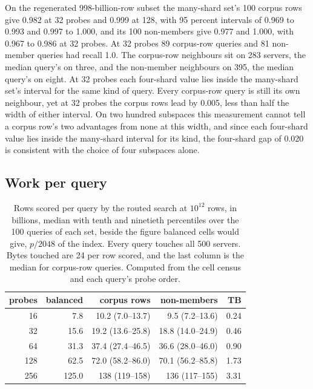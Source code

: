 \documentclass[sigconf, nonacm]{acmart}
\begin{document}
On the regenerated 998-billion-row subset the many-shard set's 100 corpus rows give 0.982 at 32
probes and
0.999 at 128, with 95 percent intervals of 0.969 to 0.993 and 0.997 to 1.000, and its 100 non-members give
0.977 and 1.000, with 0.967 to 0.986 at 32 probes. At 32 probes 89 corpus-row queries and
81 non-member queries had recall 1.0. The corpus-row neighbours sit on 283 servers, the
median query's on three, and the non-member neighbours on 395, the median query's on
eight. At 32 probes each four-shard value lies inside the many-shard set's interval for the
same kind of query. Every corpus-row query is still its own neighbour, yet at 32 probes the
corpus rows lead by 0.005, less than half the width of either interval. On two hundred
subspaces this measurement cannot tell a corpus row's two advantages from none at this width,
and since each four-shard value lies inside the many-shard interval for its kind, the four-shard
gap of 0.020 is consistent with the choice of four subspaces alone.

\subsection{Work per query}
\label{sec:work}

\begin{table}[t]
\caption{Rows scored per query by the routed search at $10^{12}$ rows, in billions, median with
tenth and ninetieth percentiles over the 100 queries of each set, beside the figure balanced cells
would give, $p/2048$ of the index. Every query touches all 500 servers. Bytes touched are 24 per
row scored, and the last column is the median for corpus-row queries. Computed from the cell census
and each query's probe order.}
\label{tab:work}
\centering
\footnotesize
\setlength{\tabcolsep}{3pt}
\begin{tabular}{rrrrr}
\toprule
probes & balanced & corpus rows & non-members & TB \\
\midrule
16  & 7.8   & 10.2 (7.0--13.7)   & 9.5 (7.2--13.6)    & 0.24 \\
32  & 15.6  & 19.2 (13.6--25.8)  & 18.8 (14.0--24.9)  & 0.46 \\
64  & 31.3  & 37.4 (27.4--46.5)  & 36.6 (28.0--46.0)  & 0.90 \\
128 & 62.5  & 72.0 (58.2--86.0)  & 70.1 (56.2--85.8)  & 1.73 \\
256 & 125.0 & 138 (119--158)     & 136 (117--155)     & 3.31 \\
\bottomrule
\end{tabular}
\end{table}
\end{document}
